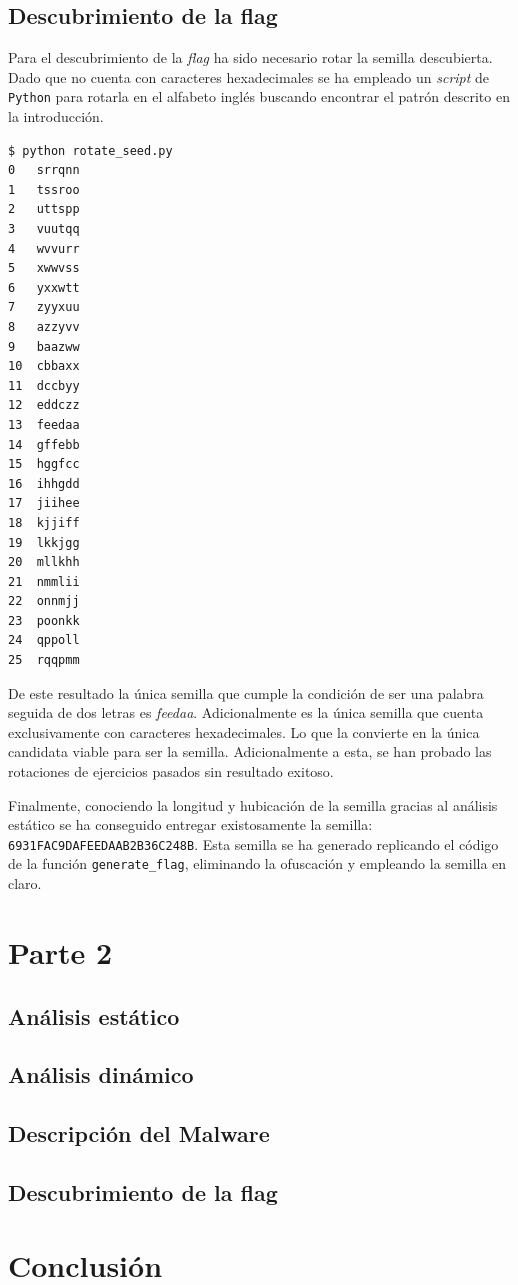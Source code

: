 \documentclass[]{article}
\begin{document}
\subsection{Descubrimiento de la flag}
\label{flag1}

Para el descubrimiento de la \textit{flag} ha sido necesario rotar la semilla
descubierta. Dado que no cuenta con caracteres hexadecimales se ha empleado un
\textit{script} de \texttt{Python} para rotarla en el alfabeto inglés buscando
encontrar el patrón descrito en la introducción.

\begin{lstlisting}[caption=Resultado de rotar la semilla en el alfabeto inglés]
$ python rotate_seed.py 
0	srrqnn
1	tssroo
2	uttspp
3	vuutqq
4	wvvurr
5	xwwvss
6	yxxwtt
7	zyyxuu
8	azzyvv
9	baazww
10	cbbaxx
11	dccbyy
12	eddczz
13	feedaa
14	gffebb
15	hggfcc
16	ihhgdd
17	jiihee
18	kjjiff
19	lkkjgg
20	mllkhh
21	nmmlii
22	onnmjj
23	poonkk
24	qppoll
25	rqqpmm
\end{lstlisting}

De este resultado la única semilla que cumple la condición de ser una palabra
seguida de dos letras es \textit{feedaa}. Adicionalmente es la única semilla
que cuenta exclusivamente con caracteres hexadecimales. Lo que la convierte en
la única candidata viable para ser la semilla. Adicionalmente a esta, se han
probado las rotaciones de ejercicios pasados sin resultado exitoso.

Finalmente, conociendo la longitud y hubicación de la semilla gracias al
análisis estático se ha conseguido entregar existosamente la semilla:
\texttt{6931FAC9DAFEEDAAB2B36C248B}. Esta semilla se ha generado replicando el
código de la función \texttt{generate\_flag}, eliminando la ofuscación y
empleando la semilla en claro.

\section{Parte 2}
\label{sec:type2}

\subsection{Análisis estático}
\label{subsec:analisis-estatico-2}

\subsection{Análisis dinámico}
\label{subsec:analisis-dinámico-2}

\subsection{Descripción del Malware}
\label{malware1}

\subsection{Descubrimiento de la flag}
\label{flag1}


\section{Conclusión}
\label{sec:conclusion}
\end{document}
